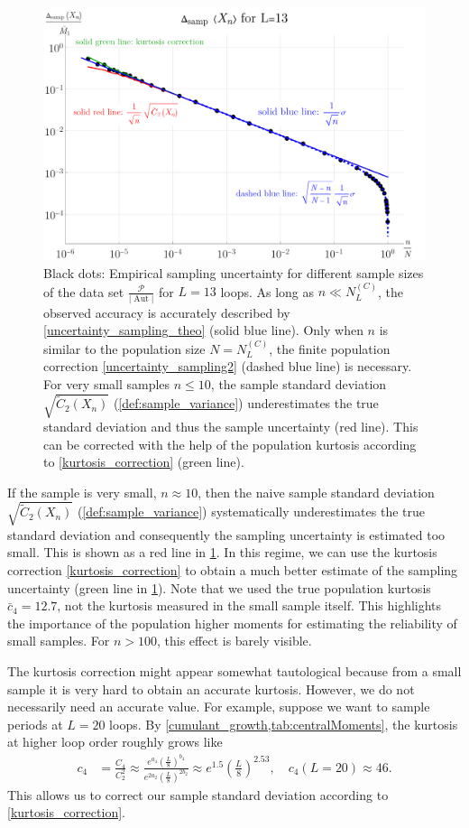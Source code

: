 \documentclass[12pt,a4paper]{article}
\newcommand{\abs}[1]{\lvert #1 \rvert}
\newcommand{\period}{\mathcal P}
\newcommand{\Aut}{\operatorname{Aut}}
\renewcommand{\|}{\rule[-0.4ex]{0.2ex}{1.2em}}
\begin{document}
\begin{figure}[htb]
	\centering
	\includegraphics[width=.75\linewidth]{sample_uncertainty}
	\caption{Black dots: Empirical sampling uncertainty for different sample sizes of the data set $\frac{\period}{\abs{\Aut}}$ for $L=13$ loops. As long as $n \ll N^{(C)}_L$, the observed accuracy is accurately described by \cref{uncertainty_sampling_theo} (solid blue line). Only when $n$ is similar to the population size $N=N^{(C)}_L$, the finite population correction \cref{uncertainty_sampling2} (dashed blue line) is necessary. For very small samples $n \leq 10$, the sample standard deviation $\sqrt{\tilde C_2(X_n)}$ (\cref{def:sample_variance}) underestimates the true standard deviation and thus the sample uncertainty (red line). This can be corrected with the help of the population kurtosis according to \cref{kurtosis_correction} (green line). }
	\label{fig:sample_uncertainty}
\end{figure}


If the sample is very small, $n \approx 10$, then the naive sample standard deviation $\sqrt{\tilde C_2(X_n)}$  (\cref{def:sample_variance}) systematically underestimates the true standard deviation and consequently the sampling uncertainty is estimated too small. This is shown as a red line in \cref{fig:sample_uncertainty}. In this regime, we can use the kurtosis correction \cref{kurtosis_correction} to obtain a much better estimate of the sampling uncertainty (green line in  \cref{fig:sample_uncertainty}). Note that we used the true population kurtosis $\bar c_4 = 12.7$, not the kurtosis measured in the small sample itself. This highlights the importance of the population higher moments for estimating the reliability of small samples. For $n > 100$, this effect is barely visible.



The kurtosis correction might appear somewhat tautological because from a small sample it is very hard to obtain an accurate kurtosis. However, we do not necessarily need an accurate value. For example, suppose we want to sample periods at $L=20$ loops. By \cref{cumulant_growth,tab:centralMoments}, the kurtosis at higher loop order roughly grows like
\begin{align*}
c_4 &= \frac{C_4}{C_2^2} \approx \frac{e^{a_4} \left( \frac L 8 \right) ^{b_4}}{e^{2 a_2} \left( \frac L 8 \right) ^{2 b_2}} \approx e^{1.5} \left( \frac L 8 \right) ^{2.53}, \quad c_4(L=20) \approx 46.
\end{align*}
This allows us to correct our sample standard deviation according to \cref{kurtosis_correction}. 
\end{document}
